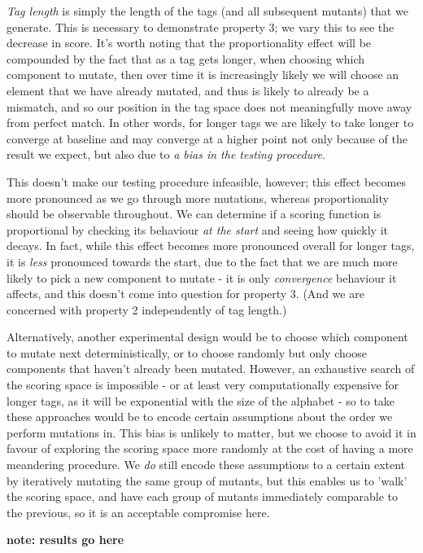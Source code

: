 \documentclass{l4proj}
\begin{document}
\textit{Tag length} is simply the length of the tags (and all subsequent mutants) that we generate. This is necessary to demonstrate property 3; we vary this to see the decrease in score. It's worth noting that the proportionality effect will be compounded by the fact that as a tag gets longer, when choosing which component to mutate, then over time it is increasingly likely we will choose an element that we have already mutated, and thus is likely to already be a mismatch, and so our position in the tag space does not meaningfully move away from perfect match. In other words, for longer tags we are likely to take longer to converge at baseline and may converge at a higher point not only because of the result we expect, but also due to \textit{a bias in the testing procedure}. 

This doesn't make our testing procedure infeasible, however; this effect becomes more pronounced as we go through more mutations, whereas proportionality should be observable throughout. We can determine if a scoring function is proportional by checking its behaviour \textit{at the start} and seeing how quickly it decays. In fact, while this effect becomes more pronounced overall for longer tags, it is \textit{less} pronounced towards the start, due to the fact that we are much more likely to pick a new component to mutate - it is only \textit{convergence} behaviour it affects, and this doesn't come into question for property 3. (And we are concerned with property 2 independently of tag length.)

Alternatively, another experimental design would be to choose which component to mutate next deterministically, or to choose randomly but only choose components that haven't already been mutated. However, an exhaustive search of the scoring space is impossible - or at least very computationally expensive for longer tags, as it will be exponential with the size of the alphabet - so to take these approaches would be to encode certain assumptions about the order we perform mutations in. This bias is unlikely to matter, but we choose to avoid it in favour of exploring the scoring space more randomly at the cost of having a more meandering procedure. We \textit{do} still encode these assumptions to a certain extent by iteratively mutating the same group of mutants, but this enables us to 'walk' the scoring space, and have each group of mutants immediately comparable to the previous, so it is an acceptable compromise here.

\textbf{note: results go here}
\end{document}
